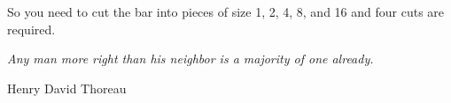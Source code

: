 \documentclass[fleqn,addpoints]{exam}
\begin{document}
\begin{questions}
\begin{solution}
So you need to cut the bar into pieces of size 1, 2, 4, 8, and 16 and four cuts are required.

\end{solution}

\end{questions}

\vspace{5 in}

{\em Any man more right than his neighbor is a majority of one already.}

\hspace{1 in} Henry David Thoreau
\end{document}
